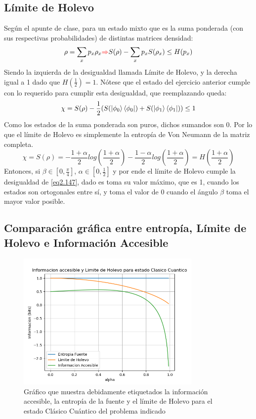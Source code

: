\documentclass{book}
\begin{document}
\subsection{Límite de Holevo}
Según el apunte de clase, para un estado mixto que es la suma ponderada (con sus respectivas probabilidades) de distintas matrices densidad: 
\begin{equation}\label{eq2.147}\rho=\sum_x p_x\rho_x \textcolor{red}{\Rightarrow} S(\rho)-\sum_x p_x S(\rho_x) \leq H(p_x)\end{equation}
Siendo la izquierda de la desigualdad llamada Límite de Holevo, y la derecha igual a 1 dado que $H(\frac{1}{2})=1$. Nótese que el estado del ejercicio anterior cumple con lo requerido para cumplir esta desigualdad, que reemplazando queda:
\begin{equation}\label{eq2.148}\chi=S(\rho)-\frac{1}{2}(S(\ket{\phi_0}\bra{\phi_0})+S(\ket{\phi_1}\bra{\phi_1}))\leq 1\end{equation}
Como los estados de la suma ponderada son puros, dichos sumandos son 0. Por lo que el límite de Holevo es simplemente la entropía de Von Neumann de la matriz completa.
\begin{equation}\label{eq2.149}\chi=S(\rho)=-\frac{1+\alpha}{2}log(\frac{1+\alpha}{2})-\frac{1-\alpha}{2}log(\frac{1+\alpha}{2})=H(\frac{1+\alpha}{2})\end{equation}
Entonces, si $\beta\in[0,\frac{\pi}{4}]$, $\alpha\in[0,\frac{1}{2}]$ y por ende el límite de Holevo cumple la desigualdad de \ref{eq2.147}, dado es toma su valor máximo, que es 1, cuando los estados son ortogonales entre sí, y toma el valor de 0 cuando el ángulo $\beta$ toma el mayor valor posible.
\subsection{Comparación gráfica entre entropía, Límite de Holevo e Información Accesible}
\begin{figure}[ht][ht]
    \includegraphics[width=0.8\textwidth]{test1.png}
    \caption{Gráfico que muestra debidamente etiquetados la información accesible, la entropía de la fuente y el límite de Holevo para el estado Clásico Cuántico del problema indicado }
\end{figure}
\end{document}
